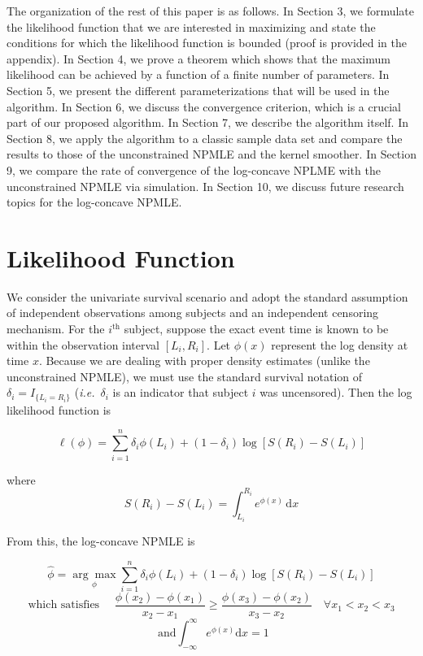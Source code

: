 \documentclass[10pt]{article}
\begin{document}
	The organization of the rest of this paper is as follows.  In Section 3, we formulate the likelihood function that we are interested in maximizing and state the conditions for which the likelihood function is bounded (proof is provided in the appendix). In Section 4, we prove a theorem which shows that the maximum likelihood can be achieved by a function of a finite number of parameters. In Section 5, we present the different parameterizations that will be used in the algorithm. In Section 6, we discuss the convergence criterion, which is a crucial part of our proposed algorithm. In Section 7, we describe the algorithm itself. In Section 8, we apply the algorithm to a classic sample data set and compare the results to those of the unconstrained NPMLE and the kernel smoother. In Section 9, we compare the rate of convergence of the log-concave NPLME with the unconstrained NPMLE via simulation. In Section 10, we discuss future research topics for the log-concave NPMLE.
	 
	 
{\section {Likelihood Function}}


	We consider the univariate survival scenario and adopt the standard assumption of independent observations among subjects and an independent censoring mechanism. For the $i^{\mathrm{th} } $ subject, suppose the exact event time is known to be within the observation interval $[L_i, R_i]$.  Let $\phi(x)$ represent the log density at time $x$. Because we are dealing with proper density estimates (unlike the unconstrained NPMLE), we must use the standard survival notation of $\delta_i = I_{ \{ L_i = R_i \} }$ (\emph{i.e.}\ $\delta_i$ is an indicator that subject $i$ was uncensored).  Then the log likelihood function is 
	
	\[\ell(\phi) = \displaystyle \sum_{i = 1}^n \delta_i \phi(L_i)   + (1 - \delta_i) \log \left[ S(R_i) - S(L_i) \right]
	\]
	
	where 
	\[
	S(R_i)  - S(L_i) = \int_{L_i}^{R_i} e^ { \phi(x) } \,\mathrm{d}x  
	\]
	
	From this, the log-concave NPMLE is 
	
	\[ \hat \phi =\underset{\phi} {\arg \max} \displaystyle \sum_{i = 1}^n \delta_i \phi(L_i)   + (1 - \delta_i) \log \left[ S(R_i) - S(L_i) \right] 
	\]
	\[
	 \text{which satisfies } \quad \frac{ \phi(x_2) - \phi(x_1)} {x_2 - x_1} \geq \frac{ \phi(x_3) - \phi(x_2)} {x_3 - x_2} \quad \forall x_1 < x_2 < x_3 
	 \]
	 \[ 
	 \text{ and} \int_{-\infty}^{\infty} e^{\phi (x) } \mathrm{d}x = 1
	\]
\end{document}

